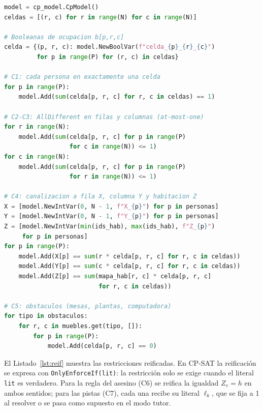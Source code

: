 \documentclass[conference,a4paper]{IEEEtran}
\begin{document}
\begin{lstlisting}[language=Python,caption={Variables y restricciones C1--C5},label={lst:globales}]
model = cp_model.CpModel()
celdas = [(r, c) for r in range(N) for c in range(N)]

# Booleanas de ocupacion b[p,r,c]
celda = {(p, r, c): model.NewBoolVar(f"celda_{p}_{r}_{c}")
         for p in range(P) for (r, c) in celdas}

# C1: cada persona en exactamente una celda
for p in range(P):
    model.Add(sum(celda[p, r, c] for r, c in celdas) == 1)

# C2-C3: AllDifferent en filas y columnas (at-most-one)
for r in range(N):
    model.Add(sum(celda[p, r, c] for p in range(P)
                  for c in range(N)) <= 1)
for c in range(N):
    model.Add(sum(celda[p, r, c] for p in range(P)
                  for r in range(N)) <= 1)

# C4: canalizacion a fila X, columna Y y habitacion Z
X = [model.NewIntVar(0, N - 1, f"X_{p}") for p in personas]
Y = [model.NewIntVar(0, N - 1, f"Y_{p}") for p in personas]
Z = [model.NewIntVar(min(ids_hab), max(ids_hab), f"Z_{p}")
     for p in personas]
for p in range(P):
    model.Add(X[p] == sum(r * celda[p, r, c] for r, c in celdas))
    model.Add(Y[p] == sum(c * celda[p, r, c] for r, c in celdas))
    model.Add(Z[p] == sum(mapa_hab[r, c] * celda[p, r, c]
                          for r, c in celdas))

# C5: obstaculos (mesas, plantas, computadora)
for tipo in obstaculos:
    for r, c in muebles.get(tipo, []):
        for p in range(P):
            model.Add(celda[p, r, c] == 0)
\end{lstlisting}

El Listado~\ref{lst:reif} muestra las restricciones reificadas. En CP-SAT la reificación se
expresa con \texttt{OnlyEnforceIf(lit)}: la restricción solo se exige cuando el literal
\texttt{lit} es verdadero. Para la regla del asesino (C6) se reifica la igualdad
$Z_v=h$ en ambos sentidos; para las pistas (C7), cada una recibe su literal $\ell_k$, que
se fija a 1 al resolver o se pasa como supuesto en el modo tutor.
\end{document}
